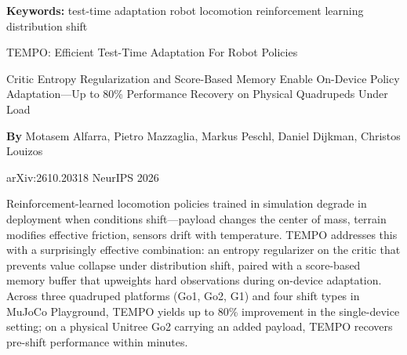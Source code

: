 \documentclass[10pt,twocolumn]{article}
\begin{document}
\setlength{\parindent}{0pt}
\setlength{\parskip}{4pt}

{\small\color{keywordgray}\textbf{Keywords:}
  test-time adaptation \textbullet{}
  robot locomotion \textbullet{}
  reinforcement learning \textbullet{}
  distribution shift}\par\vspace{4pt}

{\LARGE\bfseries\raggedright
  TEMPO: Efficient Test-Time Adaptation For
  Robot Policies}\par\vspace{4pt}

{\large\itshape\raggedright
  Critic Entropy Regularization and Score-Based Memory Enable
  On-Device Policy Adaptation---Up to 80\% Performance Recovery
  on Physical Quadrupeds Under Load}\par\vspace{6pt}

{\small\textbf{By} Motasem Alfarra, Pietro Mazzaglia, Markus Peschl,
  Daniel Dijkman, Christos Louizos}\par\vspace{2pt}

{\small\color{keywordgray}arXiv:2610.20318 \textbullet{}
  NeurIPS 2026}
\par\vspace{2pt}\noindent{\color{rulered}\rule{\columnwidth}{0.6pt}}\vspace{6pt}

Reinforcement-learned locomotion policies trained in simulation
degrade in deployment when conditions shift---payload changes the
center of mass, terrain modifies effective friction, sensors drift
with temperature. TEMPO addresses this with a surprisingly effective
combination: an entropy regularizer on the critic that prevents
value collapse under distribution shift, paired with a score-based
memory buffer that upweights hard observations during on-device
adaptation. Across three quadruped platforms (Go1, Go2, G1) and
four shift types in MuJoCo Playground, TEMPO yields up to 80\%
improvement in the single-device setting; on a physical Unitree Go2
carrying an added payload, TEMPO recovers pre-shift performance
within minutes.
\end{document}
